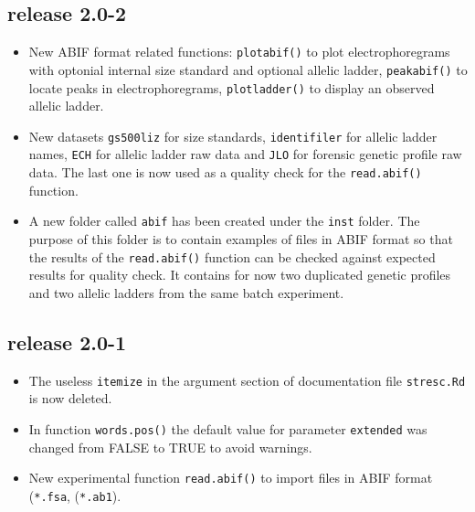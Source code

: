 \documentclass{article}
\begin{document}
\subsection*{release 2.0-2}

\begin{itemize}

\item New ABIF format related functions: \texttt{plotabif()} to plot
electrophoregrams with optonial internal size standard and optional
allelic ladder, \texttt{peakabif()} to locate peaks in electrophoregrams,
\texttt{plotladder()} to display an observed allelic ladder.

\item New datasets \texttt{gs500liz} for size standards, \texttt{identifiler}
for allelic ladder names, \texttt{ECH} for allelic ladder raw data and
\texttt{JLO} for forensic genetic profile raw data. The last one is
now used as a quality check for the \texttt{read.abif()} function.

\item A new folder called \texttt{abif} has been created under the
\texttt{inst} folder. The purpose of this folder is to contain examples
of files in ABIF format so that the results of the \texttt{read.abif()} 
function can be checked against expected results for quality check.
It contains for now two duplicated genetic profiles and two allelic
ladders from the same batch experiment.

\end{itemize}

\subsection*{release 2.0-1}

\begin{itemize}

\item The useless \texttt{itemize} in the argument section of
  documentation file \texttt{stresc.Rd} is now deleted.

\item In function \texttt{words.pos()} the default value for parameter
  \texttt{extended} was changed from FALSE to TRUE to avoid warnings.

\item New experimental function \texttt{read.abif()} to import files
  in ABIF format (\texttt{*.fsa}, (\texttt{*.ab1}).

\end{itemize}
\end{document}

